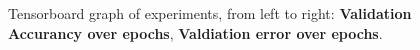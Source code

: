 \begin{figure}
	\begin{center}
		\begin{center}
			\caption{Tensorboard graph of experiments, from left to right: \textbf{Validation Accurancy over epochs}, \textbf{Valdiation error over epochs}. }
			\label{fig:tensorboard}
		\end{center}
		\vspace{-25pt}
	\end{center}
\end{figure}
